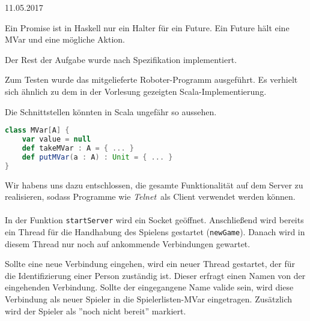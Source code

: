 \documentclass{rp}
\begin{document}


{11.05.2017} %

%
Ein Promise ist in Haskell nur ein Halter für ein Future. Ein Future hält eine MVar und eine mögliche Aktion.

Der Rest der Aufgabe wurde nach Spezifikation implementiert. 

Zum Testen wurde das mitgelieferte Roboter-Programm ausgeführt. Es verhielt sich ähnlich zu dem in der Vorlesung gezeigten Scala-Implementierung.

Die Schnittstellen könnten in Scala ungefähr so aussehen. 
\begin{lstlisting}[language=scala]
class MVar[A] {
    var value = null
    def takeMVar : A = { ... }
    def putMVar(a : A) : Unit = { ... }
}
\end{lstlisting}

Wir habens uns dazu entschlossen, die gesamte Funktionalität auf dem Server zu realisieren, sodass Programme wie \textit{Telnet} als Client verwendet werden können.\\\\

In der Funktion \texttt{startServer} wird ein Socket geöffnet. Anschließend wird bereits ein Thread für die Handhabung des Spielens gestartet (\texttt{newGame}). Danach wird in diesem Thread nur noch auf ankommende Verbindungen gewartet. 

Sollte eine neue Verbindung eingehen, wird ein neuer Thread gestartet, der für die Identifizierung einer Person zuständig ist. Dieser erfragt einen Namen von der eingehenden Verbindung. Sollte der eingegangene Name valide sein, wird diese Verbindung als neuer Spieler in die Spielerlisten-MVar eingetragen. Zusätzlich wird der Spieler als ''noch nicht bereit'' markiert. 
\end{document}
